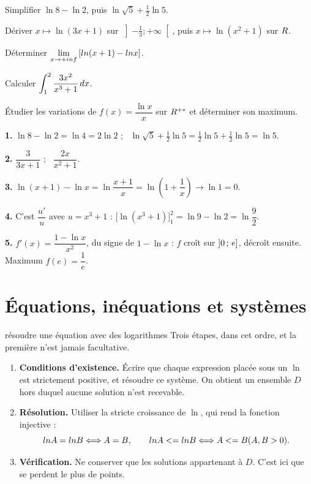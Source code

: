 \begin{entrainement}
\exo[\niveau{1}] Simplifier $\ln 8 - \ln 2$, puis $\ln\sqrt{5} + \frac12\ln 5$.

\exo[\niveau{1}] Dériver $x \mapsto \ln(3x+1)$ sur $\left]-\frac13;+\infty\right[$,
puis $x \mapsto \ln\left(x^{2}+1\right)$ sur $R$.

\exo[\niveau{2}] Déterminer $\limpinf \left[\ln(x+1) - \ln x\right]$.

\exo[\niveau{2}] Calculer $\displaystyle\int_{1}^{2}\frac{3x^{2}}{x^{3}+1}\,dx$.

\exo[\niveau{3}] Étudier les variations de $f(x) = \dfrac{\ln x}{x}$ sur
$R^{+*}$ et déterminer son maximum.
\end{entrainement}

\begin{corrige}
\textbf{1.} $\ln 8 - \ln 2 = \ln 4 = 2\ln 2$ ; \
$\ln\sqrt5 + \frac12\ln5 = \frac12\ln5+\frac12\ln5 = \ln 5$.

\textbf{2.} $\dfrac{3}{3x+1}$ ; \ $\dfrac{2x}{x^{2}+1}$.

\textbf{3.} $\ln(x+1)-\ln x = \ln\dfrac{x+1}{x} = \ln\left(1+\dfrac1x\right) \to \ln 1 = 0$.

\textbf{4.} C'est $\dfrac{u'}{u}$ avec $u = x^{3}+1$ :
$\bigl[\ln(x^{3}+1)\bigr]_{1}^{2} = \ln 9 - \ln 2 = \ln\dfrac92$.

\textbf{5.} $f'(x) = \dfrac{1-\ln x}{x^{2}}$, du signe de $1-\ln x$ : $f$ croît
sur $\left]0\,;\,e\right]$, décroît ensuite. Maximum
$f(e) = \dfrac{1}{e}$.
\end{corrige}

\section{Équations, inéquations et systèmes}

\begin{methode}{résoudre une équation avec des logarithmes}
Trois étapes, dans cet ordre, et la première n'est jamais facultative.

\begin{enumerate}[label=\textbf{\arabic*.}, leftmargin=*, itemsep=0.3em]
  \item \textbf{Conditions d'existence.} Écrire que chaque expression placée
        sous un $\ln$ est strictement positive, et résoudre ce système. On
        obtient un ensemble $D$ hors duquel aucune solution n'est recevable.
  \item \textbf{Résolution.} Utiliser la stricte croissance de $\ln$, qui rend
        la fonction injective :
        \[
          ln A = ln B \Longleftrightarrow A = B, \qquad
          ln A <= ln B \Longleftrightarrow A <= B  (A,B>0).
        \]
  \item \textbf{Vérification.} Ne conserver que les solutions appartenant
        à $D$. C'est ici que se perdent le plus de points.
\end{enumerate}
\end{methode}

